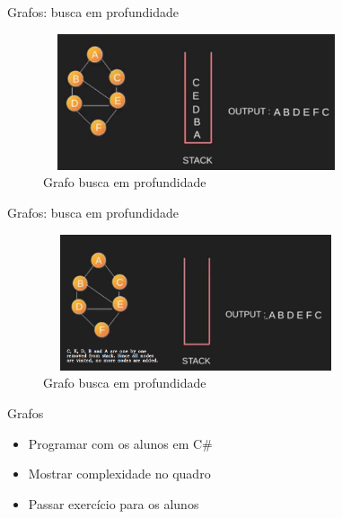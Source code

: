 \begin{frame}
	\begin{block}{Grafos: busca em profundidade}
		\begin{figure}[!htb]
			\centering	  
			\includegraphics[height=4cm, width = 9cm]{./pic/dfs8.png}
			\caption{Grafo busca em profundidade}
		\end{figure}
	\end{block}
\end{frame}

\begin{frame}
	\begin{block}{Grafos: busca em profundidade}
		\begin{figure}[!htb]
			\centering	  
			\includegraphics[height=4cm, width = 9cm]{./pic/dfs9.png}
			\caption{Grafo busca em profundidade}
		\end{figure}
	\end{block}
\end{frame}

\begin{frame}
	\begin{block}{Grafos}
		\begin{itemize}
			\item Programar com os alunos em C\#	
			\item Mostrar complexidade no quadro	
			\item Passar exercício para os alunos
		\end{itemize}
	\end{block}
\end{frame}

